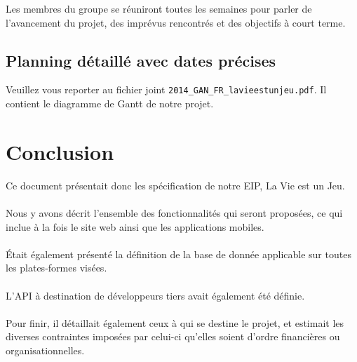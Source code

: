\documentclass{life-fr}
\begin{document}
Les membres du groupe se réuniront toutes les semaines pour parler de l'avancement du projet, des imprévus rencontrés et des objectifs à court terme.

\section{Planning détaillé avec dates précises}

Veuillez vous reporter au fichier joint \texttt{2014\_GAN\_FR\_lavieestunjeu.pdf}. Il contient le diagramme de Gantt de notre projet.


\newpage
\hspace{2cm}
\newpage


\chapter{Conclusion}


Ce document présentait donc les spécification de notre EIP, La Vie est un Jeu.\\
\\
Nous y avons décrit l'ensemble des fonctionnalités qui seront proposées, ce qui inclue à la fois le site web ainsi que les applications mobiles.\\
\\
Était également présenté la définition de la base de donnée applicable sur toutes les plates-formes visées.\\
\\
L’API à destination de développeurs tiers avait également été définie.\\
\\
Pour finir, il détaillait également ceux à qui se destine le projet, et estimait les diverses contraintes imposées par celui-ci qu’elles soient d’ordre financières ou organisationnelles.\\


\newpage
\hspace{2cm}
\newpage
\end{document}
